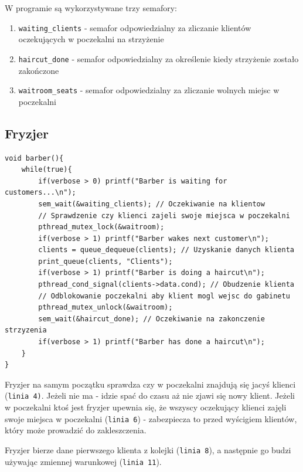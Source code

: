 \documentclass[12pt,a4paper]{article}
\begin{document}
	W programie są wykorzystywane trzy semafory:
	\begin{enumerate}
		\item \texttt{waiting{\_}clients} - semafor odpowiedzialny za
			zliczanie klientów oczekujących w poczekalni na strzyżenie
		\item \texttt{haircut{\_}done} - semafor odpowiedzialny za
			określenie kiedy strzyżenie zostało zakończone
		\item \texttt{waitroom{\_}seats} - semafor odpowiedzialny za
			zliczanie wolnych miejsc w poczekalni
	\end{enumerate}
	
	\subsection{Fryzjer}	
	
	\begin{center}
		\begin{minipage}{0.82\linewidth}
\begin{lstlisting}[caption = Funkcja fryzjera.]
void barber(){
    while(true){
        if(verbose > 0) printf("Barber is waiting for customers...\n");
        sem_wait(&waiting_clients); // Oczekiwanie na klientow
        // Sprawdzenie czy klienci zajeli swoje miejsca w poczekalni
        pthread_mutex_lock(&waitroom);
        if(verbose > 1) printf("Barber wakes next customer\n");
        clients = queue_dequeue(clients); // Uzyskanie danych klienta
        print_queue(clients, "Clients");
        if(verbose > 1) printf("Barber is doing a haircut\n");
        pthread_cond_signal(clients->data.cond); // Obudzenie klienta
        // Odblokowanie poczekalni aby klient mogl wejsc do gabinetu
        pthread_mutex_unlock(&waitroom);
        sem_wait(&haircut_done); // Oczekiwanie na zakonczenie strzyzenia
        if(verbose > 1) printf("Barber has done a haircut\n");
    }
}
\end{lstlisting}
		\end{minipage}
	\end{center}
	
	Fryzjer na samym początku sprawdza czy w poczekalni znajdują się
	jacyś klienci (\texttt{linia 4)}. Jeżeli nie ma - idzie spać do 
	czasu aż nie zjawi się nowy klient. Jeżeli w poczekalni ktoś jest 
	fryzjer upewnia się, że wszyscy oczekujący klienci zajęli swoje 
	miejsca w poczekalni (\texttt{linia 6}) - zabezpiecza to przed
	wyścigiem klientów, który może prowadzić do zakleszczenia.
	
	Fryzjer bierze dane pierwszego klienta z kolejki (\texttt{linia 8}),
	a następnie go budzi używając zmiennej warunkowej 
	(\texttt{linia 11}). 
	
\end{document}
